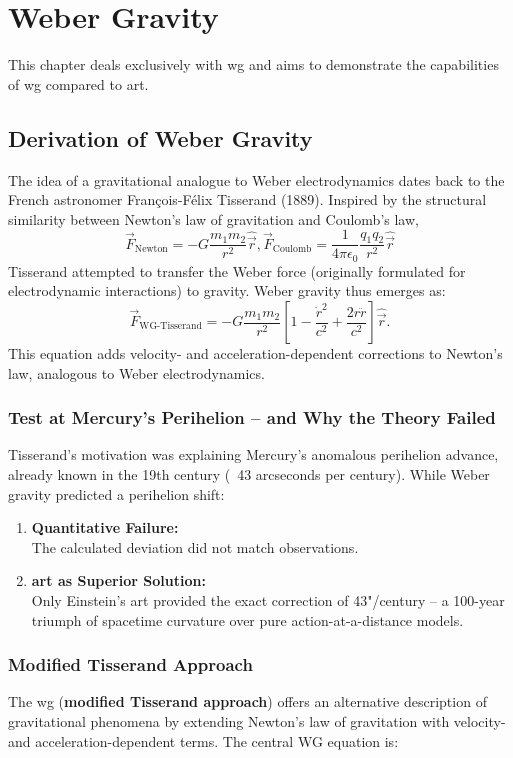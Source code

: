 \chapter{Weber Gravity}
This chapter deals exclusively with \gls{wg} and aims to demonstrate the capabilities of \gls{wg} compared to \gls{art}.
\section{Derivation of Weber Gravity}
The idea of a gravitational analogue to Weber electrodynamics dates back to the French astronomer François-Félix Tisserand (1889). Inspired by the structural
similarity between Newton's law of gravitation and Coulomb's law,
\begin{equation}
    \vec{F}_{\text{Newton}} = -G \frac{m_1 m_2}{r^2} \hat{\vec{r}}, \vec{F}_{\text{Coulomb}} = \frac{1}{4 \pi \epsilon_0} \frac{q_1 q_2}{r^2} \hat{\vec{r}}
\end{equation}
Tisserand attempted to transfer the Weber force (originally formulated for electrodynamic interactions) to gravity. Weber gravity thus emerges as:
\begin{equation}
    \vec{F}_{\text{WG-Tisserand}} = -G \frac{m_1 m_2}{r^2} \left[ 1 - \frac{\dot{r}^2}{c^2} + \frac{2 r \ddot{r}}{c^2} \right] \hat{\vec{r}}.
\end{equation}
This equation adds velocity- and acceleration-dependent corrections to Newton's law, analogous to Weber electrodynamics.
\subsection{Test at Mercury's Perihelion – and Why the Theory Failed}
Tisserand's motivation was explaining Mercury's anomalous perihelion advance, already known in the 19th century (~43 arcseconds per century).
While Weber gravity predicted a perihelion shift:
\begin{enumerate}
    \item \textbf{Quantitative Failure:}\\The calculated deviation did not match observations.
    \item \textbf{\gls{art} as Superior Solution:}\\Only Einstein's \gls{art} provided the exact correction of 43"/century – a 100-year triumph of
    spacetime curvature over pure action-at-a-distance models.
\end{enumerate}

\subsection{Modified Tisserand Approach}
The \gls{wg} (\textbf{modified Tisserand approach}) offers an alternative description of gravitational phenomena by extending Newton's law of gravitation with
velocity- and acceleration-dependent terms. The central WG equation is:

